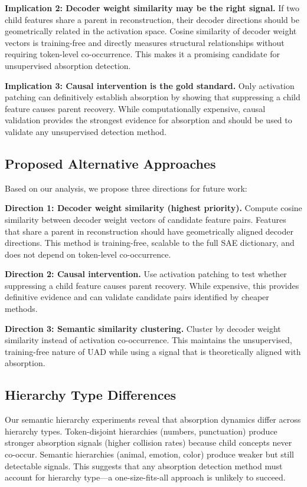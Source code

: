 \documentclass{article}
\begin{document}
\textbf{Implication 2: Decoder weight similarity may be the right signal.}
If two child features share a parent in reconstruction, their decoder directions should be geometrically related in the activation space. Cosine similarity of decoder weight vectors is training-free and directly measures structural relationships without requiring token-level co-occurrence. This makes it a promising candidate for unsupervised absorption detection.

\textbf{Implication 3: Causal intervention is the gold standard.}
Only activation patching can definitively establish absorption by showing that suppressing a child feature causes parent recovery. While computationally expensive, causal validation provides the strongest evidence for absorption and should be used to validate any unsupervised detection method.

\subsection{Proposed Alternative Approaches}

Based on our analysis, we propose three directions for future work:

\textbf{Direction 1: Decoder weight similarity (highest priority).}
Compute cosine similarity between decoder weight vectors of candidate feature pairs. Features that share a parent in reconstruction should have geometrically aligned decoder directions. This method is training-free, scalable to the full SAE dictionary, and does not depend on token-level co-occurrence.

\textbf{Direction 2: Causal intervention.}
Use activation patching to test whether suppressing a child feature causes parent recovery. While expensive, this provides definitive evidence and can validate candidate pairs identified by cheaper methods.

\textbf{Direction 3: Semantic similarity clustering.}
Cluster by decoder weight similarity instead of activation co-occurrence. This maintains the unsupervised, training-free nature of UAD while using a signal that is theoretically aligned with absorption.

\subsection{Hierarchy Type Differences}

Our semantic hierarchy experiments reveal that absorption dynamics differ across hierarchy types. Token-disjoint hierarchies (numbers, punctuation) produce stronger absorption signals (higher collision rates) because child concepts never co-occur. Semantic hierarchies (animal, emotion, color) produce weaker but still detectable signals. This suggests that any absorption detection method must account for hierarchy type---a one-size-fits-all approach is unlikely to succeed.
\end{document}

